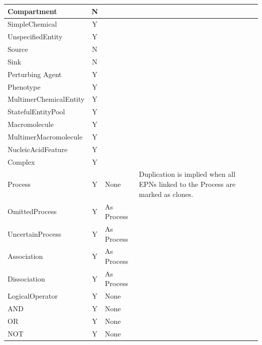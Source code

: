 \begin{center}
\label{tab:processduprules}
\begin{footnotesize}
\tablelasttail{\hline}
\begin{supertabular}{|l|c|p{4cm}|p{3.5cm}|}\hline
Compartment   & N & & \\\hline
SimpleChemical & Y &  & \\\hline
UnspecifiedEntity & Y &  & \\\hline
Source & N & & \\\hline
Sink & N & & \\\hline
Perturbing Agent & Y &  & \\\hline
Phenotype & Y &  & \\\hline
MultimerChemicalEntity & Y &  & \\\hline
StatefulEntityPool & Y &  & \\\hline
Macromolecule & Y &  & \\\hline
MultimerMacromolecule & Y &  & \\\hline
Nucleic\-Acid\-Feature & Y &  & \\\hline
Complex & Y &  & \\\hline
Process & Y & None & Duplication is implied when all EPNs linked to the Process are marked as clones.\\\hline
OmittedProcess & Y & As Process  & \\\hline
UncertainProcess & Y & As Process  & \\\hline
Association & Y & As Process  & \\\hline
Dissociation & Y & As Process  & \\\hline
LogicalOperator & Y & None & \\\hline
AND & Y & None & \\\hline
OR & Y & None & \\\hline
NOT & Y & None & \\\hline
\end{supertabular}
\end{footnotesize}
\end{center}


